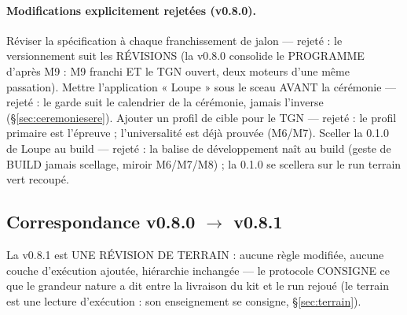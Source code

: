 \paragraph{Modifications explicitement rejetées (v0.8.0).} Réviser la spécification
à chaque franchissement de jalon — rejeté : le versionnement suit les RÉVISIONS (la
v0.8.0 consolide le PROGRAMME d'après M9 : M9 franchi ET le TGN ouvert, deux
moteurs d'une même passation). Mettre l'application « Loupe » sous le sceau AVANT
la cérémonie — rejeté : le garde suit le calendrier de la cérémonie, jamais
l'inverse (§\ref{sec:ceremoniesere}). Ajouter un profil de cible pour le TGN —
rejeté : le profil primaire  est l'épreuve ; l'universalité
est déjà prouvée (M6/M7). Sceller la 0.1.0 de Loupe au build — rejeté : la balise
de développement naît au build (geste de BUILD jamais scellage, miroir
M6/M7/M8) ; la 0.1.0 se scellera sur le run terrain vert recoupé.

\subsection{Correspondance v0.8.0 $\to$ v0.8.1}\label{sec:evolutions081}

La v0.8.1 est UNE RÉVISION DE TERRAIN : aucune règle modifiée, aucune couche
d'exécution ajoutée, hiérarchie inchangée — le protocole CONSIGNE ce que le
grandeur nature a dit entre la livraison du kit et le run rejoué (le terrain est
une lecture d'exécution : son enseignement se consigne, §\ref{sec:terrain}).

